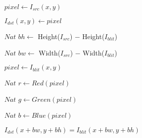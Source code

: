 \begin{algorithm}[H]
  \begin{algorithmic}[1]
		
			  
			  \STATE $pixel \gets I_{src}(x,y)$
			  
			  \STATE $I_{dst}(x,y) \gets pixel$
			  
			\ENDFOR

		 \ENDFOR
		 
		\STATE $Nat$ $ bh \gets $ Height($I_{src}$) $-$ Height($I_{blit}$)
			  
		\STATE $Nat$ $ bw \gets $ Width($I_{src}$) $-$ Width($I_{blit}$)


			  
			  \STATE $pixel \gets I_{blit}(x,y)$
			  
			  \STATE $Nat$ $ r \gets Red(pixel) $
			  
			  \STATE $Nat$ $g \gets Green(pixel)$
			  
			  \STATE $Nat$ $ b \gets Blue(pixel)$


				\STATE $I_{dst}(x+bw,y+bh) = I_{blit}(x+bw,y+bh)$ 
			  \ENDIF
			  
			\ENDFOR

		 \ENDFOR


  \end{algorithmic}
  \caption{$blit (I_{src}, I_{dst}, I_{blit})$}
  \label{alg:blit}
\end{algorithm}
